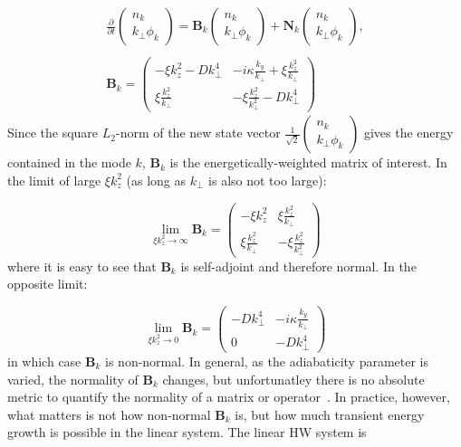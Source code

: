 \documentclass[letter,scriptaddress,twocolumn, prl,showkeys]{revtex4}
\def\beq{\begin{equation}}
\def\eeq{\end{equation}}
\def\beqar{\begin{eqnarray}}
\def\eeqar{\end{eqnarray}}
\begin{document}
\beqar
\label{fourier_en_eqn}
\frac{\partial}{\partial t} \left( \begin{array}{cc} n_k \\ k_\perp \phi_k \end{array} \right) = \mathbf{B}_k \left( \begin{array}{cc} n_k \\ k_\perp \phi_k \end{array} \right) + \mathbf{N}_k \left( \begin{array}{cc} n_k \\ k_\perp \phi_k \end{array} \right), \\ \nonumber \\
\label{B_k}
\mathbf{B}_k = \left( \begin{array}{cc} -\xi k_z^2 - D k_\perp^4 & -i \kappa \frac{k_y}{k_\perp} + \xi \frac{k_z^2}{k_\perp} \\  \xi \frac{k_z^2}{k_\perp} & - \xi \frac{k_z^2}{k_\perp^2} - D k_\perp^4\end{array} \right)
\eeqar
Since the square $L_2$-norm of the new state vector $\frac{1}{\sqrt{2}} \left( \begin{array}{cc} n_k \\ k_\perp \phi_k \end{array} \right)$ gives the energy contained in the mode $k$,
$\mathbf{B}_k$ is the energetically-weighted matrix of interest. In the limit of large $\xi k_z^2$ (as long as $k_\perp$ is also not too large):

\beq
\label{B_norm_limit}
\displaystyle\lim_{\xi k_z^2 \to \infty} \mathbf{B}_k = \left( \begin{array}{cc} -\xi k_z^2 & \xi \frac{k_z^2}{k_\perp} \\  \xi \frac{k_z^2}{k_\perp} & - \xi \frac{k_z^2}{k_\perp^2} \end{array} \right)
\eeq
where it is easy to see that $\mathbf{B}_k$ is self-adjoint and therefore normal. In the opposite limit:

\beq
\label{B_norm_limit0}
\displaystyle\lim_{\xi k_z^2 \to 0} \mathbf{B}_k = \left( \begin{array}{cc} - D k_\perp^4 & -i \kappa \frac{k_y}{k_\perp} \\ 0  & - D k_\perp^4\end{array} \right)
\eeq
in which case $\mathbf{B}_k$ is non-normal. In general, as the adiabaticity parameter is varied, the normality of $\mathbf{B}_k$ changes, but unfortunatley there is no absolute metric to quantify
the normality of a matrix or operator~\cite{trefethen2005}. In practice, however, what matters is not how non-normal $\mathbf{B}_k$ is, but how much transient energy growth is possible in the linear
system. The linear HW system is
\end{document}

